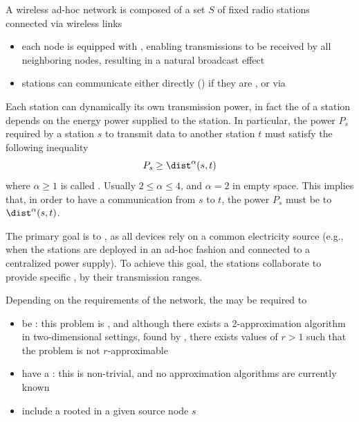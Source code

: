 \documentclass[a4paper, 12pt]{report}
\begin{document}
    A wireless ad-hoc network is composed of a set $S$ of fixed radio stations connected via wireless links

    \begin{itemize}
        \item each node is equipped with , enabling transmissions to be received by all neighboring nodes, resulting in a natural broadcast effect
        \item stations can communicate either directly () if they are , or via 
    \end{itemize}

    Each station can dynamically  its own transmission power, in fact the  of a station depends on the energy power supplied to the station. In particular, the power $P_s$ required by a station $s$ to transmit data to another station $t$ must satisfy the following inequality $$P_s \ge \dist^\alpha(s, t)$$ where $\alpha \ge 1$ is called . Usually $2 \le \alpha \le 4$, and $\alpha = 2$ in empty space. This implies that, in order to have a communication from $s$ to $t$, the power $P_s$ must be  to $\dist^\alpha(s, t)$. 

    The primary goal is to , as all devices rely on a common electricity source (e.g., when the stations are deployed in an ad-hoc fashion and connected to a centralized power supply). To achieve this goal, the stations collaborate to provide specific , by  their transmission ranges.

    Depending on the requirements of the network, the  may be required to

    \begin{itemize}
        \item be : this problem is \NPHard, and although there exists a 2-approximation algorithm in two-dimensional settings, found by \textcite{kirousis}, there exists values of $r > 1$ such that the problem is not $r$-approximable
        \item have a : this is non-trivial, and no approximation algorithms are currently known
        \item include a  rooted in a given source node $s$
    \end{itemize}
\end{document}
